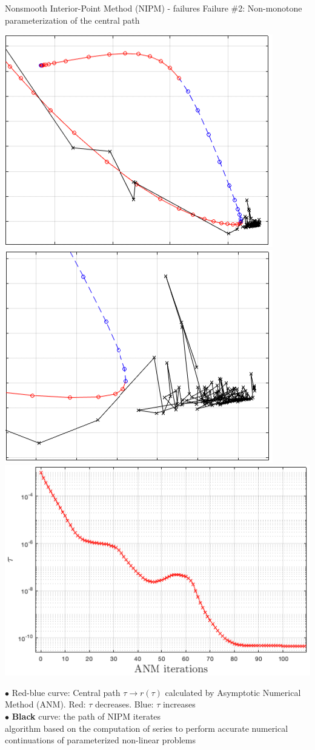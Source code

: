 \begin{frame}{Nonsmooth Interior-Point Method (NIPM) - failures}
    \vspace{-0.1cm}
    {\large Failure \#2:} Non-monotone parameterization of the central path 
    

    \begin{center}
        \includegraphics[width=0.32\linewidth]{./figure/IPM/images/anm_cone6.png}
        \includegraphics[width=0.32\linewidth]{./figure/IPM/images/anm_cone6_2.png}
        \includegraphics[width=0.34\linewidth]{./figure/IPM/images/tau2t.png}
      \end{center}
      {$\bullet$} {\small  {\color{red}Red}-{\color{blue}blue} curve: Central path $\tau \to r(\tau)$ calculated by Asymptotic Numerical Method (ANM). {\color{red}Red}: $\tau$ decreases. {\color{blue}Blue}: $\tau$ increases \\[6pt]    {$\bullet$} \textbf{Black} curve: the path of NIPM iterates}\\[3mm]

      
     algorithm based on the computation of series to perform accurate numerical continuations of parameterized  non-linear problems

  \end{frame}
